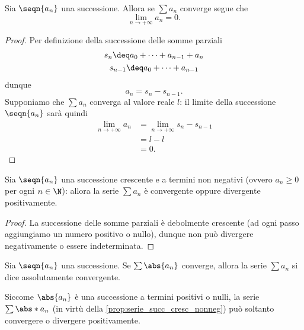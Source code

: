 \begin{proposition}
    Sia $\seqn{a_n}$ una successione. Allora se $\sum a_n$ converge segue che \[
        \lim_{n\to +\infty} a_n = 0. 
    \]
\end{proposition}
\begin{proof}
    Per definizione della successione delle somme parziali \begin{gather*}
        s_n \deq a_0 + \dots + a_{n-1} + a_n\\
        s_{n-1} \deq a_0 + \dots + a_{n-1}
    \end{gather*} dunque \[
        a_n = s_n - s_{n-1}.    
    \] Supponiamo che $\sum a_n$ converga al valore reale $l$: il limite della successione $\seqn{a_n}$ sarà quindi \begin{align*}
           \lim_{n\to +\infty} a_n
        &= \lim_{n\to +\infty} s_n - s_{n-1} \\
        &= l - l\\
        &= 0.
    \end{align*}
\end{proof}

\begin{proposition}
    \label{prop:serie_succ_cresc_nonneg}
    Sia $\seqn{a_n}$ una successione crescente e a termini non negativi (ovvero $a_n \geq 0$ per ogni $n \in \N$): allora la serie $\sum a_n$ è convergente oppure divergente positivamente. 
\end{proposition}
\begin{proof}
    La successione delle somme parziali è debolmente crescente (ad ogni passo aggiungiamo un numero positivo o nullo), dunque non può divergere negativamente o essere indeterminata.
\end{proof}

\begin{definition}
     Sia $\seqn{a_n}$ una successione. Se $\sum \abs{a_n}$ converge, allora la serie $\sum a_n$ si dice assolutamente convergente.
\end{definition}

\begin{remark}
    Siccome $\abs{a_n}$ è una successione a termini positivi o nulli, la serie $\sum \abs*{a_n}$ (in virtù della \autoref{prop:serie_succ_cresc_nonneg}) può soltanto convergere o divergere positivamente.
\end{remark}

